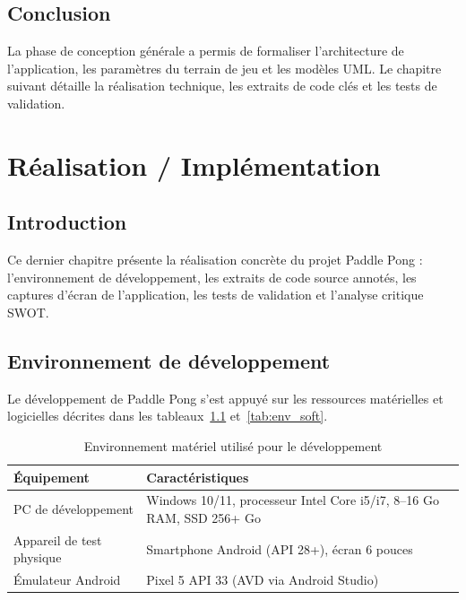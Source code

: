 \documentclass[12pt,a4paper]{report}
\begin{document}
\section*{Conclusion}
La phase de conception g\'en\'erale a permis de formaliser l'architecture de l'application, les param\`etres du terrain de jeu et les mod\`eles UML. Le chapitre suivant d\'etaille la r\'ealisation technique, les extraits de code cl\'es et les tests de validation.

\newpage

\chapter{R\'ealisation / Impl\'ementation}

\section*{Introduction}
Ce dernier chapitre pr\'esente la r\'ealisation concr\`ete du projet Paddle Pong : l'environnement de d\'eveloppement, les extraits de code source annot\'es, les captures d'\'ecran de l'application, les tests de validation et l'analyse critique SWOT.

\section{Environnement de d\'eveloppement}
Le d\'eveloppement de Paddle Pong s'est appuy\'e sur les ressources mat\'erielles et logicielles d\'ecrites dans les tableaux~\ref{tab:env_hard} et~\ref{tab:env_soft}.

\begin{table}[H]
\centering
\caption{Environnement mat\'eriel utilis\'e pour le d\'eveloppement}
\label{tab:env_hard}
\begin{tabularx}{\textwidth}{lX}
\toprule
\textbf{\'Equipement} & \textbf{Caract\'eristiques} \\
\midrule
PC de d\'eveloppement & Windows 10/11, processeur Intel Core i5/i7, 8--16 Go RAM, SSD 256+ Go \\
Appareil de test physique & Smartphone Android (API 28+), \'ecran 6 pouces \\
\'Emulateur Android & Pixel 5 API 33 (AVD via Android Studio) \\
\bottomrule
\end{tabularx}
\end{table}
\end{document}
